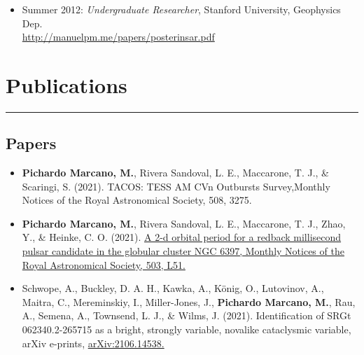 \documentclass[letterpaper,10pt]{article}
\begin{document}
\begin{itemize}[label=$\blacktriangleright$]
  \item Summer 2012: \emph{Undergraduate Researcher}, Stanford University, Geophysics Dep.\ \\
\url{http://manuelpm.me/papers/posterinsar.pdf} 
  \end{itemize}

\section*{Publications }%
\hrule
\vspace{.3 cm}
\subsection*{Papers}
\begin{itemize}[label=$\blacktriangleright$]

\subsubsection*{Refereed}



        
        \item \textbf{Pichardo Marcano, M.}, Rivera Sandoval, L. E., Maccarone, T. J., \& Scaringi, S. (2021). TACOS: TESS AM CVn Outbursts Survey,Monthly Notices of the Royal Astronomical Society, 508, 3275.


        
                
            \item \textbf{Pichardo Marcano, M.}, Rivera Sandoval, L. E., Maccarone, T. J., Zhao, Y., \& Heinke, C. O. (2021). \href{https://ui.adsabs.harvard.edu/abs/2021MNRAS.503L..51P/abstract}{A 2-d orbital period for a redback millisecond pulsar candidate in the globular cluster NGC 6397, Monthly Notices of the Royal Astronomical Society, 503, L51.}
        
        
        \item Schwope, A., Buckley, D. A. H., Kawka, A., K\"onig, O., Lutovinov, A., Maitra, C., Mereminskiy, I., Miller-Jones, J., \textbf{Pichardo Marcano, M.}, Rau, A., Semena, A., Townsend, L. J., \& Wilms, J. (2021). Identification of SRGt 062340.2-265715 as a bright, strongly variable, novalike cataclysmic variable, arXiv e-prints, \href{https://ui.adsabs.harvard.edu/abs/2021arXiv210614538S/abstract}{arXiv:2106.14538.}






\end{itemize}
\end{document}
